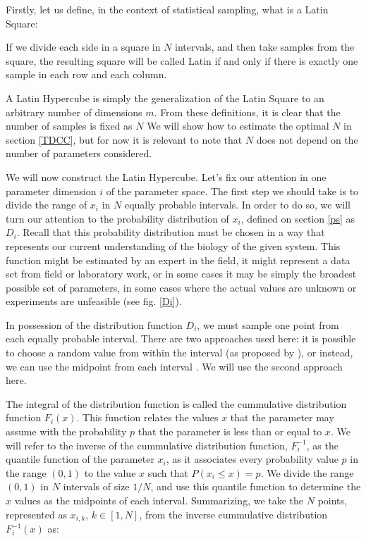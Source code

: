 Firstly, let us define, in the context of statistical sampling, what is a 
Latin Square:
\begin{definition}
If we divide each side in a square in $N$ intervals, and then take samples
from the square, the resulting square will be called
Latin if and only if there is exactly one sample in each row and each column.
\end{definition}

A Latin Hypercube is simply the generalization of the Latin
Square to an arbitrary number of dimensions $m$. 
From these definitions, it is clear that the number of samples is fixed as $N$
We will show how to estimate the optimal $N$ in section \ref{TDCC}, but for
now it is 
relevant to note that $N$ does not depend on the number of parameters considered.

We will now construct the Latin Hypercube. Let's fix our attention in one parameter
dimension $i$ of the parameter space.
The first step we should take is to divide the range of $x_i$
in $N$ equally probable intervals. In order to do so, we will turn our attention
to the probability distribution of $x_i$, defined on section \ref{ps} as $D_i$.
Recall that this probability distribution must be chosen in a way that represents our
current understanding of the biology of the given system. This function might
be estimated by an expert in the field, it might represent a data set from
field or laboratory work, or in some cases it may be simply the broadest
possible set of parameters, in some cases where the actual values are unknown
or experiments are unfeasible (see fig. \ref{Di}). 

In possession of the distribution function $D_i$, we must sample one point
from each equally probable interval. There are two approaches used here:
it is possible to choose a random value from within the interval (as proposed
by \cite{McKay79}), or instead, we can use the midpoint from each interval 
\cite{Huntington98}. We will use the second approach here.

The integral of the distribution function is called the cummulative distribution
function $F_i(x)$. This function relates the values $x$ that the parameter may assume
with the probability $p$ that the parameter is less than or equal to $x$.
We will refer to the inverse of the cummulative distribution function, $F_i^{-1}$,
as the quantile function of the parameter $x_i$, as it associates every probability
value $p$ in the range $(0,1)$ to the value $x$ such that $P(x_i \leq x) = p$.
We divide the range $(0,1)$ in $N$ intervals of size $1/N$, and use this quantile
function to determine the $x$ values as the midpoints of each interval. 
Summarizing, we take the $N$ points, represented as $x_{i,k}$, $k \in [1,N]$, 
from the inverse cummulative distribution $F_i^{-1}(x)$ as:

